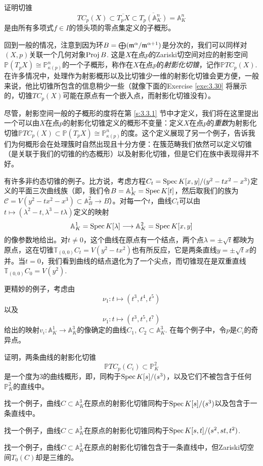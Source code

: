\begin{exe}\label{exe:3.29}
	证明切锥
	\[
		TC_p(X)\subset \overline{T_pX}\subset \overline{T_p(\mathbb A_K^n)}=\mathbb A_K^n
	\]
	是由所有多项式$f\in I$的领头项的零点集定义的子概形。
\end{exe}

回到一般的情况，注意到因为环$B=\bigoplus (\mathfrak{m}^\alpha/\mathfrak{m}^{\alpha+1})$是分次的，我们可以同样对$(X,p)$关联一个几何对象$\operatorname{Proj} B$. 这是$X$在点$p$的Zariski切空间对应的射影空间$\mathbb P(T_p X)\cong \mathbb P^n_{\kappa(p)}$的一个子概形，称作在$X$在点$p$的\textit{射影化切锥}，记作$\mathbb PTC_p(X)$. 在许多情况中，处理作为射影概形以及比切锥少一维的射影化切锥会更方便，一般来说，他比切锥所包含的信息稍少一些（就像下面的Exercise \ref{exe:3.30} 将展示的，切锥$TC_p(X)$可能在原点有一个嵌入点，而射影化切锥没有）。

尽管，射影空间一般的子概形的度将在第 \ref{s:3.3.1} 节中才定义，我们将在这里提出一个可以由$X$在点$p$的射影化切锥定义的概形不变量：定义$X$在点$p$的\textit{重数}为射影化切锥$\mathbb PTC_p(X)\subset \mathbb P(T_p X)\cong \mathbb P^n_{\kappa(p)}$的度。这个定义展现了另一个例子，告诉我们为何概形会在处理簇时自然出现且十分方便：在簇范畴我们依然可以定义切锥（是关联于我们的切锥的约态概形）以及射影化切锥，但是它们在族中表现得并不好。


有许多非约态切锥的例子。比方说，考虑方程$C_t=\operatorname{Spec} K[x,y]/(y^2-tx^2-x^3)$定义的平面三次曲线族（即，我们令$B=\mathbb A^1_K=\operatorname{Spec} K[t]$，然后取我们的族为$\mathscr C=V(y^2-tx^2-x^3)\subset \mathbb A_B^2\to B$）。对每一个$t$，曲线$C_t$可以由$t\mapsto (\lambda^2-t,\lambda^3-t\lambda)$定义的映射
\[
	\mathbb A_K^1=\operatorname{Spec} K[\lambda]\longrightarrow \mathbb A_K^2=\operatorname{Spec} K[x,y]
\]
的像参数地给出。对$t\neq 0$，这个曲线在原点有一个结点，两个点$\lambda =\pm \sqrt t$都映为原点，这在切锥$\mathbb T_{(0,0)}C_t=V(y^2-tx^2)$也有所反应，它是两条直线$y=\pm \sqrt t x$的并。当$t=0$，我们看到曲线的结点退化为了一个尖点，而切锥现在是双重直线$\mathbb T_{(0,0)}C_0=V(y^2)$.

更精妙的例子，考虑由
\[
	\nu_1:t\longmapsto (t^3,t^4,t^5)
\]
以及
\[
	\nu_1:t\longmapsto (t^3,t^5,t^7)
\]
给出的映射$v_i:\mathbb A_K^1\to \mathbb A_K^3$的像确定的曲线$C_1$, $C_2\subset \mathbb A_K^3$. 在每个例子中，令$p$是$C_i$的奇异点。

\begin{exe}\label{exe:3.30}
	\begin{compactenum}[(a)]
		\item 证明，两条曲线的射影化切锥
		\[
			\mathbb PTC_p(C_i)\subset \mathbb P_K^2
		\]
		是一个度为$3$的曲线概形，即，同构于$\operatorname{Spec} K[s]/(s^3)$，以及它们不被包含于任何$\mathbb P_K^2$的直线中。
		\item 找一个例子，曲线$C\subset \mathbb A_K^3$在原点的射影化切锥同构于$\operatorname{Spec} K[s]/(s^3)$以及包含于一条直线中。
		\item 找一个例子，曲线$C\subset \mathbb A_K^3$在原点的射影化切锥同构于$\operatorname{Spec} K[s,t]/(s^2,st,t^2)$.
		\item 找一个例子，曲线$C\subset \mathbb A_K^3$在原点的射影化切锥包含于一条直线中，但Zariski切空间$T_0(C)$却是三维的。
	\end{compactenum}
\end{exe}

